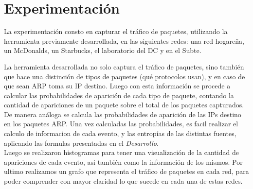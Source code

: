 \section{Experimentación}
La experimentación consto en capturar el tráfico de paquetes, utilizando la herramienta previamente desarrollada, en las siguientes redes: una red hogareña, un McDonalds, un Starbucks, el laboratorio del DC y en el Subte.

La herramienta desarrollada no solo captura el tráfico de paquetes, sino también que hace una distinción de tipos de paquetes (qué protocolos usan), y en caso de que sean ARP toma su IP destino. Luego con esta información se procede a calcular las probabilidades de aparición de cada tipo de paquete, contando la cantidad de apariciones de un paquete sobre el total de los paquetes capturados. De manera análoga se calcula las probabilidades de aparición de las IPs destino en los paquetes ARP. Una vez calculadas las probabilidades, es facil realizar el calculo de informacion de cada evento, y las entropías de las distintas fuentes, aplicando las formulas presentadas en el \textit{Desarrollo}.\\

Luego se realizaron histogramas para tener una visualización de la cantidad de apariciones de cada evento, asi también como la información de los mismos.
Por ultimo realizamos un grafo que representa el tráfico de paquetes en cada red, para poder comprender con mayor claridad lo que sucede en cada una de estas redes.
\newpage


\newpage


\newpage


\newpage


\newpage


\newpage


